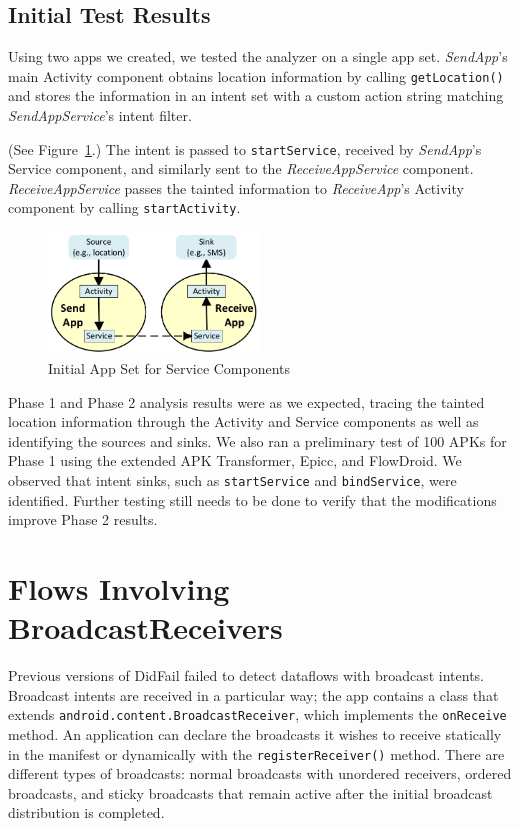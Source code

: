 \section{Initial Test Results}
Using two apps we created, we tested the analyzer on a single app set. \emph{SendApp}'s main Activity component obtains location information by calling \texttt{getLocation()} and stores the information in an intent set with a custom action string matching \emph{SendAppService}'s intent filter.

(See Figure~\ref{fig:servicetest1}.) The intent is passed to \texttt{startService}, received by \emph{SendApp}'s Service component, and similarly sent to the \emph{ReceiveAppService} component. \emph{ReceiveAppService} passes the tainted information to \emph{ReceiveApp}'s Activity component by calling \texttt{startActivity}.

\begin{figure}[h]
	\centering
	\includegraphics[width=0.50\textwidth]{serviceapps_v2.png}
	\caption{Initial App Set for Service Components}
	\label{fig:servicetest1}
\end{figure}

Phase 1 and Phase 2 analysis results were as we expected, tracing the tainted location information through the Activity and Service components as well as identifying the sources and sinks. We also ran a preliminary test of 100 APKs for Phase 1 using the extended APK Transformer, Epicc, and FlowDroid. We observed that intent sinks, such as \texttt{startService} and \texttt{bindService}, were identified. Further testing still needs to be done to verify that the modifications improve Phase 2 results.

\chapter{Flows Involving BroadcastReceivers} \label{chap:broadcast_receivers}
Previous versions of DidFail failed to detect dataflows with broadcast intents. Broadcast intents are received in a particular way; the app contains a class that extends \texttt{android.content.BroadcastReceiver}, which implements the \texttt{onReceive} method. An application can declare the broadcasts it wishes to receive statically in the manifest or dynamically with the \texttt{registerReceiver()} method. There are different types of broadcasts: normal broadcasts with unordered receivers, ordered broadcasts, and sticky broadcasts that remain active after the initial broadcast distribution is completed.


